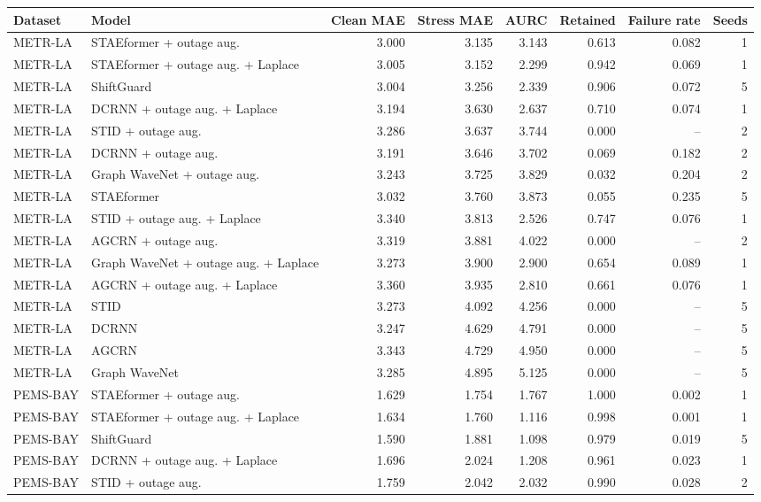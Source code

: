 \begin{tabular}{llrrrrrr}
\toprule
Dataset & Model & Clean MAE & Stress MAE & AURC & Retained & Failure rate & Seeds \\
\midrule
METR-LA & STAEformer + outage aug. & 3.000 & 3.135 & 3.143 & 0.613 & 0.082 & 1 \\
METR-LA & STAEformer + outage aug. + Laplace & 3.005 & 3.152 & 2.299 & 0.942 & 0.069 & 1 \\
METR-LA & ShiftGuard & 3.004 & 3.256 & 2.339 & 0.906 & 0.072 & 5 \\
METR-LA & DCRNN + outage aug. + Laplace & 3.194 & 3.630 & 2.637 & 0.710 & 0.074 & 1 \\
METR-LA & STID + outage aug. & 3.286 & 3.637 & 3.744 & 0.000 & -- & 2 \\
METR-LA & DCRNN + outage aug. & 3.191 & 3.646 & 3.702 & 0.069 & 0.182 & 2 \\
METR-LA & Graph WaveNet + outage aug. & 3.243 & 3.725 & 3.829 & 0.032 & 0.204 & 2 \\
METR-LA & STAEformer & 3.032 & 3.760 & 3.873 & 0.055 & 0.235 & 5 \\
METR-LA & STID + outage aug. + Laplace & 3.340 & 3.813 & 2.526 & 0.747 & 0.076 & 1 \\
METR-LA & AGCRN + outage aug. & 3.319 & 3.881 & 4.022 & 0.000 & -- & 2 \\
METR-LA & Graph WaveNet + outage aug. + Laplace & 3.273 & 3.900 & 2.900 & 0.654 & 0.089 & 1 \\
METR-LA & AGCRN + outage aug. + Laplace & 3.360 & 3.935 & 2.810 & 0.661 & 0.076 & 1 \\
METR-LA & STID & 3.273 & 4.092 & 4.256 & 0.000 & -- & 5 \\
METR-LA & DCRNN & 3.247 & 4.629 & 4.791 & 0.000 & -- & 5 \\
METR-LA & AGCRN & 3.343 & 4.729 & 4.950 & 0.000 & -- & 5 \\
METR-LA & Graph WaveNet & 3.285 & 4.895 & 5.125 & 0.000 & -- & 5 \\
PEMS-BAY & STAEformer + outage aug. & 1.629 & 1.754 & 1.767 & 1.000 & 0.002 & 1 \\
PEMS-BAY & STAEformer + outage aug. + Laplace & 1.634 & 1.760 & 1.116 & 0.998 & 0.001 & 1 \\
PEMS-BAY & ShiftGuard & 1.590 & 1.881 & 1.098 & 0.979 & 0.019 & 5 \\
PEMS-BAY & DCRNN + outage aug. + Laplace & 1.696 & 2.024 & 1.208 & 0.961 & 0.023 & 1 \\
PEMS-BAY & STID + outage aug. & 1.759 & 2.042 & 2.032 & 0.990 & 0.028 & 2 \\

\end{tabular}
